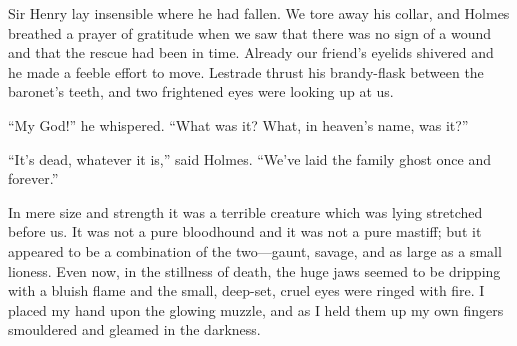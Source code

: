 \documentclass[paper=5.5in:8.5in,BCOR=7mm,twoside,DIV=calc,12pt,usegeometry,openany,chapterprefix,endperiod,headings=big]{scrbook} %
\begin{document}
Sir Henry lay insensible where he had fallen. We tore away his collar, and Holmes breathed a prayer of gratitude when we saw that there was no sign of a wound and that the rescue had been in time. Already our friend's eyelids shivered and he made a feeble effort to move. Lestrade thrust his brandy-flask between the baronet's teeth, and two frightened eyes were looking up at us.

\enquote{My God!} he whispered. \enquote{What was it? What, in heaven's name, was it?}

\enquote{It's dead, whatever it is,} said Holmes. \enquote{We've laid the family ghost once and forever.}

In mere size and strength it was a terrible creature which was lying stretched before us. It was not a pure bloodhound and it was not a pure mastiff; but it appeared to be a combination of the two---gaunt, savage, and as large as a small lioness. Even now, in the stillness of death, the huge jaws seemed to be dripping with a bluish flame and the small, deep-set, cruel eyes were ringed with fire. I placed my hand upon the glowing muzzle, and as I held them up my own fingers smouldered and gleamed in the darkness.

\end{document}
